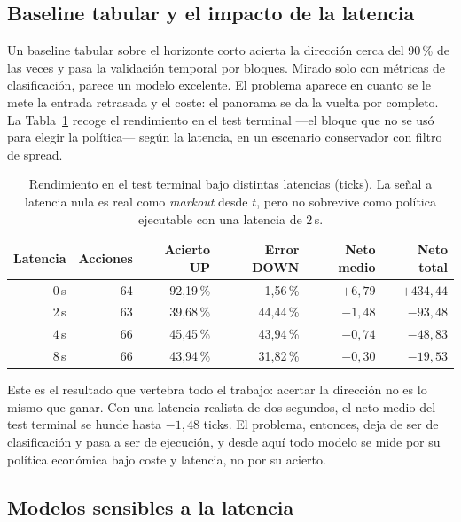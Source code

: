 \documentclass[11pt,a4paper]{article}
\begin{document}
\subsection{Baseline tabular y el impacto de la latencia}

Un baseline tabular sobre el horizonte corto acierta la dirección cerca del 90\,\%
de las veces y pasa la validación temporal por bloques. Mirado solo con métricas de
clasificación, parece un modelo excelente. El problema aparece en cuanto se le mete
la entrada retrasada y el coste: el panorama se da la vuelta por completo. La
Tabla~\ref{tab:stress} recoge el rendimiento en el test terminal ---el bloque que no
se usó para elegir la política--- según la latencia, en un escenario conservador con
filtro de spread.

\begin{table}[H]
\centering
\small
\begin{tabular}{rrrrrr}
\toprule
\textbf{Latencia} & \textbf{Acciones} & \textbf{Acierto UP} & \textbf{Error DOWN} & \textbf{Neto medio} & \textbf{Neto total} \\
\midrule
$0$\,s & 64 & 92,19\,\% & 1,56\,\%  & $+6{,}79$  & $+434{,}44$ \\
$2$\,s & 63 & 39,68\,\% & 44,44\,\% & $-1{,}48$  & $-93{,}48$  \\
$4$\,s & 66 & 45,45\,\% & 43,94\,\% & $-0{,}74$  & $-48{,}83$  \\
$8$\,s & 66 & 43,94\,\% & 31,82\,\% & $-0{,}30$  & $-19{,}53$  \\
\bottomrule
\end{tabular}
\caption{Rendimiento en el test terminal bajo distintas latencias (ticks). La
señal a latencia nula es real como \emph{markout} desde $t$, pero no sobrevive
como política ejecutable con una latencia de $2$\,s.}
\label{tab:stress}
\end{table}

Este es el resultado que vertebra todo el trabajo: acertar la dirección no es lo
mismo que ganar. Con una latencia realista de dos segundos, el neto medio del test
terminal se hunde hasta $-1{,}48$ ticks. El problema, entonces, deja de ser de
clasificación y pasa a ser de ejecución, y desde aquí todo modelo se mide por su
política económica bajo coste y latencia, no por su acierto.

\subsection{Modelos sensibles a la latencia}
\end{document}
